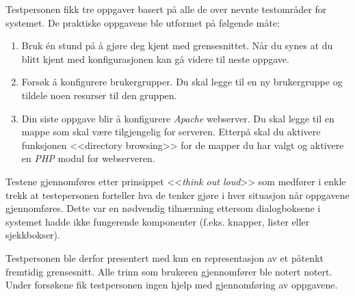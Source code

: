 Testpersonen fikk tre oppgaver basert på alle de over nevnte testområder for systemet.
De praktiske oppgavene ble utformet på følgende måte:
\begin{enumerate}
\setlength{\itemsep}{1pt}
\setlength{\parskip}{0pt}
\setlength{\parsep}{0pt}

\item Bruk én stund på å gjøre deg kjent med grensesnittet. Når du synes at du blitt kjent med konfigurasjonen kan gå videre til neste oppgave.
\item Forsøk å konfigurere brukergrupper. Du skal legge til en ny brukergruppe og tildele noen resurser til den gruppen.
\item Din siste oppgave blir å konfigurere \textit{Apache} webserver. 
Du skal legge til en mappe som skal være tilgjengelig for serveren. 
Etterpå skal du aktivere funksjonen <<directory browsing>> for de mapper du har valgt og aktivere en \textit{PHP} modul for webserveren.
\end{enumerate}

Testene gjennomføres etter prinsippet <<\textit{think out loud}>> som medfører i enkle trekk at testepersonen forteller hva de tenker gjøre i hver situasjon når oppgavene gjennomføres. 
Dette var en nødvendig tilnærming ettersom dialogboksene i systemet hadde ikke fungerende komponenter (f.eks. knapper, lister eller sjekkbokser).

Testpersonen ble derfor presentert med kun en representasjon av et påtenkt fremtidig grensesnitt. 
Alle trinn som brukeren gjennomfører ble notert notert. 
Under forsøkene fik testpersonen ingen hjelp med gjennomføring av oppgavene.

